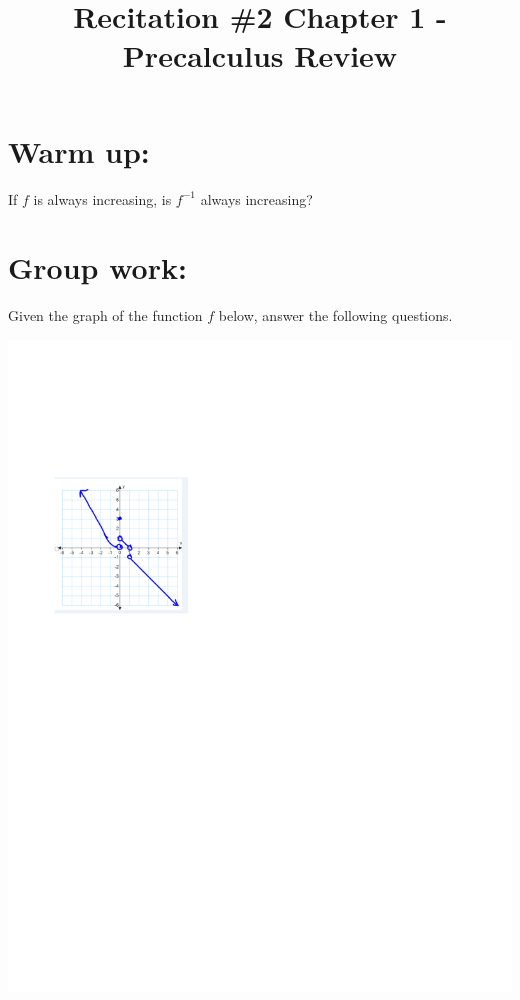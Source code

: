 \documentclass[handout,nooutcomes]{ximera}
\title{Recitation \#2 Chapter 1 - Precalculus Review}
\begin{document}
\begin{abstract}		\end{abstract}
\maketitle

\section*{Warm up:}
   
If $f$ is always increasing, is $f^{-1}$ always increasing?


\section*{Group work:}
	\begin{problem}
	 	Given the graph of the function $f$ below, answer the following questions.
			
\begin{image}		
\includegraphics[trim= 80 460 300 170]{Figure3.pdf}
\end{image}	


\end{problem}
\end{document}
